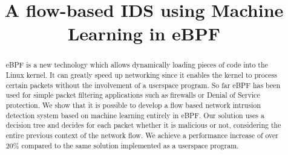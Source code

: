 \documentclass[conference]{IEEEtran}
\begin{document}
\title{A flow-based IDS using Machine Learning in eBPF}

\author{
}





\maketitle%



\begin{abstract}
eBPF is a new technology which allows dynamically loading pieces of code into the Linux kernel. It can greatly speed up networking since it enables the kernel to process certain packets without the involvement of a userspace program. So far eBPF has been used for simple packet filtering applications such as firewalls or Denial of Service protection. We show that it is possible to develop a flow based network intrusion detection system based on machine learning entirely in eBPF. Our solution uses a decision tree and decides for each packet whether it is malicious or not, considering the entire previous context of the network flow. We achieve a performance increase of over 20\% compared to the same solution implemented as a userspace program. 
\end{abstract}
\end{document}
